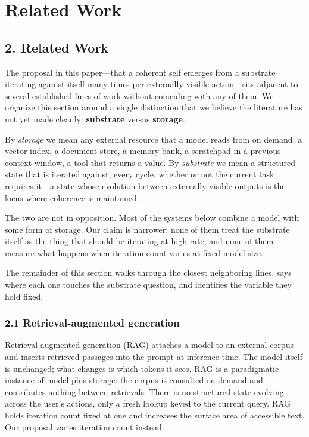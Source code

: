 \documentclass[11pt,letterpaper]{article}
\begin{document}
\section{Related Work}
\subsection*{2. Related Work}

The proposal in this paper---that a coherent self emerges from a substrate iterating against itself many times per externally visible action---sits adjacent to several established lines of work without coinciding with any of them. We organize this section around a single distinction that we believe the literature has not yet made cleanly: \textbf{substrate} versus \textbf{storage}.

By \emph{storage} we mean any external resource that a model reads from on demand: a vector index, a document store, a memory bank, a scratchpad in a previous context window, a tool that returns a value. By \emph{substrate} we mean a structured state that is iterated against, every cycle, whether or not the current task requires it---a state whose evolution between externally visible outputs is the locus where coherence is maintained.

The two are not in opposition. Most of the systems below combine a model with some form of storage. Our claim is narrower: none of them treat the substrate itself as the thing that should be iterating at high rate, and none of them measure what happens when iteration count varies at fixed model size.

The remainder of this section walks through the closest neighboring lines, says where each one touches the substrate question, and identifies the variable they hold fixed.

\subsubsection*{2.1 Retrieval-augmented generation}

Retrieval-augmented generation (RAG) attaches a model to an external corpus and inserts retrieved passages into the prompt at inference time. The model itself is unchanged; what changes is which tokens it sees. RAG is a paradigmatic instance of model-plus-storage: the corpus is consulted on demand and contributes nothing between retrievals. There is no structured state evolving across the user's actions, only a fresh lookup keyed to the current query. RAG holds iteration count fixed at one and increases the surface area of accessible text. Our proposal varies iteration count instead.
\end{document}
